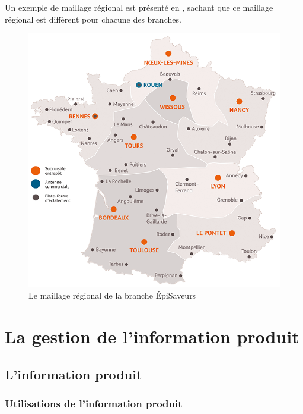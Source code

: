             Un exemple de maillage régional est présenté en , sachant que ce maillage régional est différent pour chacune des branches.
            \begin{figure}[htpb]
                \begin{center}
                \includegraphics[width=\linewidth]{img/reseau es.png}
                \end{center}
                \caption{Le maillage régional de la branche \'{E}piSaveurs}
                \label{fig:reseau_es}
            \end{figure}


    \section{La gestion de l'information produit}
    
        \subsection{L'information produit}
        
            \subsubsection{Utilisations de l'information produit}
            \label{utilisation_info_produit}

